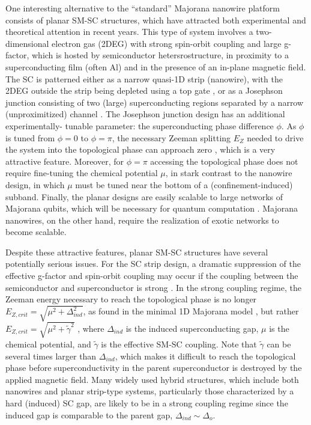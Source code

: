 \documentclass[twocolumn,aps,prb,nofootinbib]{revtex4-2}
\begin{document}
One interesting alternative to the ``standard'' Majorana nanowire platform consists of planar SM-SC structures, which have attracted both experimental \cite{Shabani2016,Kjaergaard2016,Nichele2017,Suominen2017,OFarrell2018,Fornieri2019,Lee2019a,Ren2019,Pankratova2020,Mayer2020,Dartiailh2021} and theoretical \cite{Hell2017a,Pientka2017,Hell2017,Setiawan2019a,Setiawan2019b,Scharf2019,Woods2020b,Laeven2020,Zhang2020,Zhou2020,Pakizer2021,Lesser2021} attention in recent years. 
This type of  system involves a two-dimensional electron gas (2DEG) with strong spin-orbit coupling and large g-factor, which is hosted by semiconductor hetersrostructure, in proximity to a superconducting film (often Al) and in the presence of an in-plane magnetic field. The SC is patterned either as  a narrow quasi-1D strip (nanowire), with the 2DEG outside the strip being depleted using a top gate  \cite{Nichele2017,Suominen2017,Woods2020b}, or as a Josephson junction consisting of two (large) superconducting regions separated by a narrow (unproximitized) channel \cite{Fornieri2019,Ren2019,Dartiailh2021,Hell2017,Pientka2017}. The Josephson junction design has an additional experimentally- tunable parameter: the superconducting phase difference $\phi$. As $\phi$ is tuned from $\phi = 0$ to $\phi = \pi$, the necessary Zeeman splitting $E_Z$ needed to drive the system into the topological phase can approach zero \cite{Hell2017a,Pientka2017},  which is a very attractive feature. Moreover, for $\phi = \pi$  accessing the topological phase does not require  fine-tuning the chemical potential $\mu$, in stark contrast to the nanowire design, in which $\mu$ must be tuned near the bottom of a (confinement-induced) subband. Finally,  the planar designs are easily scalable to large networks of Majorana qubits, which will be necessary for quantum computation \cite{Divincenzo2000}. Majorana nanowires, on the other hand,  require the realization of exotic  networks \cite{Krizek2018} to become scalable. 

Despite these attractive features, planar SM-SC structures have several potentially serious  issues. For the SC strip design,  a dramatic suppression of the effective g-factor and spin-orbit coupling may occur if the coupling between the semiconductor and superconductor is strong \cite{Stanescu2017a,Reeg2018a}. In the strong coupling regime, the Zeeman energy necessary to reach the topological phase is no longer $E_{Z,crit} = \sqrt{\mu^2 + \Delta_{ind}^2}$, as found in the minimal 1D Majorana model \cite{Lutchyn2010,Oreg2010,Sau2010,Sau2010a}, but rather $E_{Z,crit} = \sqrt{\mu^2 + \widetilde{\gamma}^2}$ \cite{Stanescu2017a}, where $\Delta_{ind}$ is the induced superconducting gap, $\mu$ is the chemical potential, and $\widetilde{\gamma}$ is the effective SM-SC coupling. Note that $\widetilde{\gamma}$ can be several times larger than $\Delta_{ind}$, which makes it difficult to reach the topological phase before superconductivity in the parent superconductor is destroyed by the applied magnetic field. Many widely used hybrid structures, which include both nanowires and planar strip-type systems, particularly those characterized by a hard (induced) SC gap, are likely  to be in a strong coupling regime since the induced gap is comparable to the parent gap, $\Delta_{ind} \sim \Delta_o$. 
\end{document}
